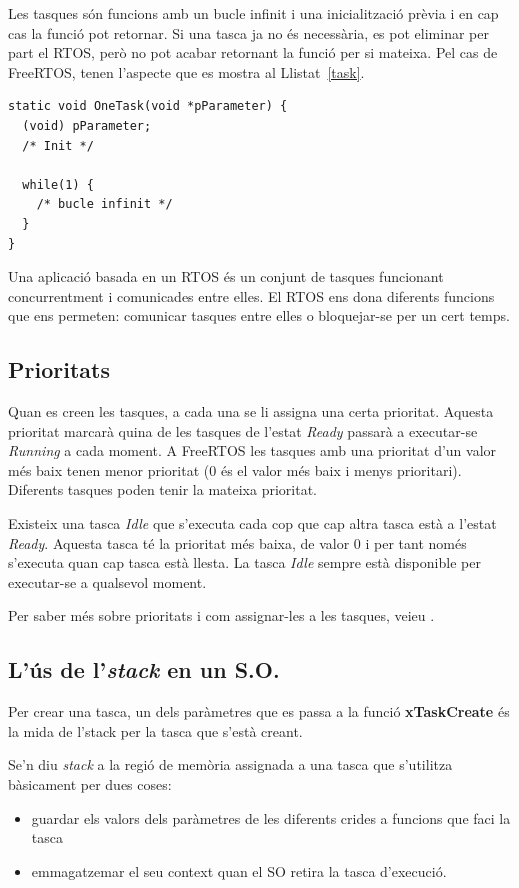 Les tasques són funcions amb un bucle infinit i una inicialització prèvia i en cap cas la funció pot retornar. Si una tasca ja no és necessària, es pot eliminar per part el RTOS, però no pot acabar retornant la funció per si mateixa.
Pel cas de \gls{FreeRTOS}, tenen l'aspecte que es mostra al Llistat~\ref{task}.

\begin{lstlisting}[caption={Esquelet d'una tasca},style=customc,label=task]
static void OneTask(void *pParameter) {
  (void) pParameter;
  /* Init */

  while(1) {
    /* bucle infinit */
  }
}
\end{lstlisting}

Una aplicació basada en un RTOS és un conjunt de tasques funcionant concurrentment i comunicades entre elles. El \gls{RTOS} ens dona diferents funcions que ens permeten: comunicar tasques entre elles o bloquejar-se per un cert temps.

\subsection{Prioritats}

Quan es creen les tasques, a cada una se li assigna una certa prioritat. Aquesta prioritat marcarà quina de les tasques de l'estat {\em Ready} passarà a executar-se {\em Running} a cada moment. A \gls{FreeRTOS} les tasques amb una prioritat d'un valor més baix tenen menor prioritat (0 és el valor més baix i menys prioritari). Diferents tasques poden tenir la mateixa prioritat.

Existeix una tasca {\em Idle} que s'executa cada cop que cap altra tasca està a l'estat {\em Ready}. Aquesta tasca té la prioritat més baixa, de valor 0 i per tant només s'executa quan cap tasca està llesta. La tasca {\em Idle} sempre està disponible per executar-se a qualsevol moment.

Per saber més sobre prioritats i com assignar-les a les tasques, veieu .
\subsection{L'ús de l'{\em stack} en un S.O.}
\label{sub:StackOS}
Per crear una tasca, un dels paràmetres que es passa a la funció {\bf xTaskCreate} és la mida de l'\gls{stack} per la tasca que s'està creant.

Se'n diu {\em stack} a la regió de memòria assignada a una tasca que s'utilitza bàsicament per dues coses:
\begin{itemize}
 \item guardar els valors dels paràmetres de les diferents crides a funcions que faci la tasca
 \item emmagatzemar el seu context quan el SO retira la tasca d'execució.
\end{itemize}

